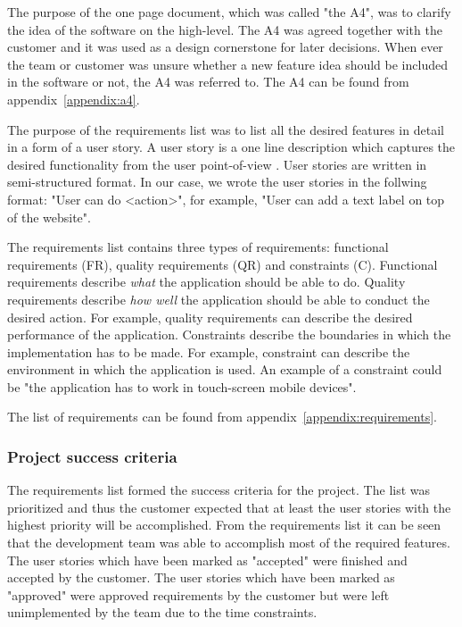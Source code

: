 \documentclass[english,12pt,a4paper,pdftex]{article}
\begin{document}
The purpose of the one page document, which was called "the A4", was to clarify the idea of the software on the high-level. The A4 was agreed together with the customer and it was used as a design cornerstone for later decisions. When ever the team or customer was unsure whether a new feature idea should be included in the software or not, the A4 was referred to. The A4 can be found from appendix~\ref{appendix:a4}.

The purpose of the requirements list was to list all the desired features in detail in a form of a user story. A user story is a one line description which captures the desired functionality from the user point-of-view \citep{userstory}. User stories are written in semi-structured format. In our case, we wrote the user stories in the follwing format: "User can do <action>", for example, "User can add a text label on top of the website".

The requirements list contains three types of requirements: functional requirements (FR), quality requirements (QR) and constraints (C). Functional requirements describe \emph{what} the application should be able to do. Quality requirements describe \emph{how well} the application should be able to conduct the desired action. For example, quality requirements can describe the desired performance of the application. Constraints describe the boundaries in which the implementation has to be made. For example, constraint can describe the environment in which the application is used. An example of a constraint could be "the application has to work in touch-screen mobile devices".

The list of requirements can be found from appendix~\ref{appendix:requirements}.

\subsubsection{Project success criteria}

The requirements list formed the success criteria for the project. The list was prioritized and thus the customer expected that at least the user stories with the highest priority will be accomplished. From the requirements list it can be seen that the development team was able to accomplish most of the required features. The user stories which have been marked as "accepted" were finished and accepted by the customer. The user stories which have been marked as "approved" were approved requirements by the customer but were left unimplemented by the team due to the time constraints.
\end{document}
